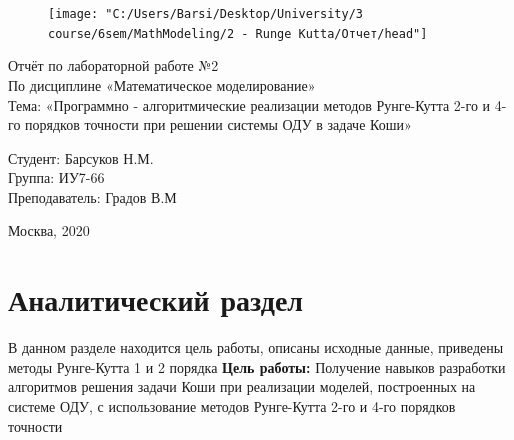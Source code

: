 \documentclass[12pt,a4paper]{scrartcl}
\begin{document}
\begin{titlepage}
\newpage
\begin{figure}[H]
	\centering
	\texttt{[image: "C:/Users/Barsi/Desktop/University/3 course/6sem/MathModeling/2 - Runge Kutta/Отчет/head"]}
\end{figure}

\vspace{5cm}
\begin{center}
\Large Отчёт по лабораторной работе №2 \\ По дисциплине «Математическое моделирование» \\ Тема: «Программно - алгоритмические реализации методов Рунге-Кутта 2-го и 4-го порядков точности при решении системы ОДУ в задаче Коши» 
\end{center}
\vspace{6em}
\begin{flushright}
Студент: \hrulefill Барсуков Н.М. \\
\vspace{1.5em}
Группа: \hrulefill ИУ7-66\\
\vspace{1.5em}
Преподаватель: \hrulefill Градов В.М\\
\vspace{1.5em}
\end{flushright}
\vspace{\fill}
\begin{center}
Москва, 2020
\end{center}
\end{titlepage}
\newpage
\tableofcontents
{}

\newpage
\section{Аналитический раздел}
	В данном разделе находится цель работы, описаны исходные данные, приведены методы Рунге-Кутта 1 и 2 порядка
\textbf{Цель работы:} Получение навыков разработки алгоритмов решения задачи Коши при реализации моделей, построенных на системе ОДУ, с использование методов Рунге-Кутта 2-го и 4-го порядков точности
\end{document}
